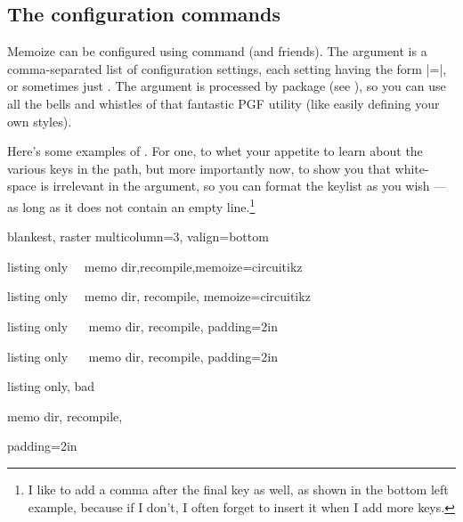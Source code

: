 \documentclass[a4paper,11pt]{article}
\begin{document}
\endgroup %


\subsection{The configuration commands}
\label{sec:mmzset}

Memoize can be configured using command 
(and friends). The  argument is a comma-separated list of
configuration settings, each setting having the form |=|,
or sometimes just .  The  argument is processed by package
 (see ), so you can use all the bells and whistles
of that fantastic PGF utility (like easily defining your own styles).

Here's some examples of .  For one, to whet your appetite to learn
about the various keys in the  path, but more importantly now, to show
you that white-space is irrelevant in the  argument, so you can
format the keylist as you wish --- as long as it does not contain an empty
line.\footnote{I like to add a comma after the final key as well, as shown in
  the bottom left example, because if I don't, I often forget to insert it when
  I add more keys.}

\begin{tcbraster}[raster columns=4, raster valign=bottom]
  \begin{tcboxedraster}[raster columns=1]{blankest, raster multicolumn=3, valign=bottom}
    \begin{tcblisting}{listing only}
~\mmzset~{memo dir,recompile,memoize=circuitikz}
    \end{tcblisting}
    \begin{tcblisting}{listing only}
~\mmzset~{memo dir, recompile, memoize=circuitikz}
    \end{tcblisting}
  \end{tcboxedraster}
  \begin{tcblisting}{listing only}
~\mmzset~{
  memo dir,
  recompile,
  padding=2in}
  \end{tcblisting}
\end{tcbraster}\par
\begin{tcbraster}[raster columns=4, raster valign=top]
  \begin{tcblisting}{listing only}
~\mmzset~{
  memo dir,
  recompile,
  padding=2in
}
  \end{tcblisting}
  \begin{tcblisting}{listing only, bad}
~\mmzset~{
  memo dir,
  recompile,
  
  padding=2in
}
  \end{tcblisting}
\end{tcbraster}
\end{document}
